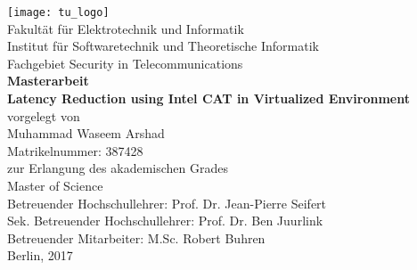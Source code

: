 \begin{titlepage}
    \begin{center}
        \vspace*{0.5cm}

        \texttt{[image: tu\_logo]} \\
		\vspace{0.25cm}
		\textnormal{Fakult{\"a}t f{\"u}r Elektrotechnik und Informatik} \\
		\textnormal{Institut f{\"u}r Softwaretechnik und Theoretische Informatik} \\
		\textnormal{Fachgebiet Security in Telecommunications} \\
		\vspace{1.0cm}
		\textbf{\Large{Masterarbeit}}\\
		\vspace{1.0cm}
		\textbf{\LARGE{Latency Reduction using Intel CAT in Virtualized Environment}} \\
		\vspace{1.5cm}
		\textnormal{\large{vorgelegt von}} \\
		\vspace{0.25cm}
        \textnormal{\Large{Muhammad Waseem Arshad}} \\
        \textnormal{\large{Matrikelnummer: 387428}} \\
		\vspace{1.0cm}
		\textnormal{\large{zur Erlangung des akademischen Grades}} \\
		\vspace{0.25cm}
		\textnormal{\Large{Master of Science}} \\
		\vspace{2cm}
		\textnormal{\large{Betreuender Hochschullehrer: Prof. Dr. Jean-Pierre Seifert}} \\
		\textnormal{\large{Sek. Betreuender Hochschullehrer: Prof. Dr. Ben Juurlink}} \\
		\textnormal{\large{Betreuender Mitarbeiter: M.Sc. Robert Buhren}} \\
		\vspace{2cm}
		\textnormal{\Large{Berlin, 2017}}\\
        

\end{center}
\end{titlepage}
